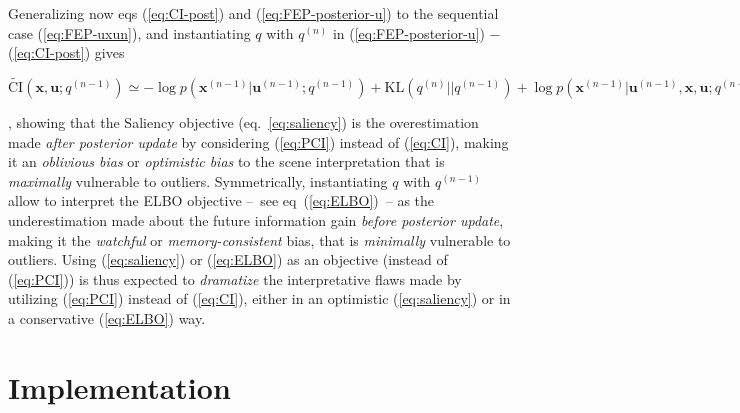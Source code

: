 \documentclass{article}
\begin{document}
Generalizing now eqs (\ref{eq:CI-post}) and (\ref{eq:FEP-posterior-u}) to the sequential case (\ref{eq:FEP-uxun}), 
and instantiating $q$ with $q^{(n)}$ in  (\ref{eq:FEP-posterior-u}) $-$ (\ref{eq:CI-post}) gives
	\begin{small}
$
		\tilde{\text{CI}}(\boldsymbol{x},\boldsymbol{u}; q^{(n-1)}) \simeq
		-\log p(\boldsymbol{x}^{(n-1)}| \boldsymbol{u}^{(n-1)}; q^{(n-1)}) 
		+ \text{KL}(q^{(n)}||q^{(n-1)})
		+ \log p(\boldsymbol{x}^{(n-1)}| \boldsymbol{u}^{(n-1)}, \boldsymbol{x}, \boldsymbol{u}; q^{(n-1)}) 
$
	\end{small},
showing that the Saliency objective (eq.~\ref{eq:saliency}) is the overestimation made \emph{after posterior update} by considering (\ref{eq:PCI}) instead of (\ref{eq:CI}), making it an \emph{oblivious bias} or \emph{optimistic bias} to the scene interpretation that is \emph{maximally} vulnerable to outliers.
Symmetrically, 
instantiating $q$ with $q^{(n-1)}$  allow to interpret the ELBO objective
--~see eq~(\ref{eq:ELBO})~-- as  the underestimation made about the future information gain \emph{before posterior update}, making it the \emph{watchful} or \emph{memory-consistent} bias, that is \emph{minimally} vulnerable to outliers.
Using (\ref{eq:saliency}) or (\ref{eq:ELBO}) as an objective (instead of (\ref{eq:PCI})) is thus expected to \emph{dramatize} the interpretative flaws made by utilizing  (\ref{eq:PCI}) instead of (\ref{eq:CI}), either in an optimistic (\ref{eq:saliency}) or in a conservative (\ref{eq:ELBO}) way. 

\section{Implementation}\label{sec:fovea}
\end{document}
